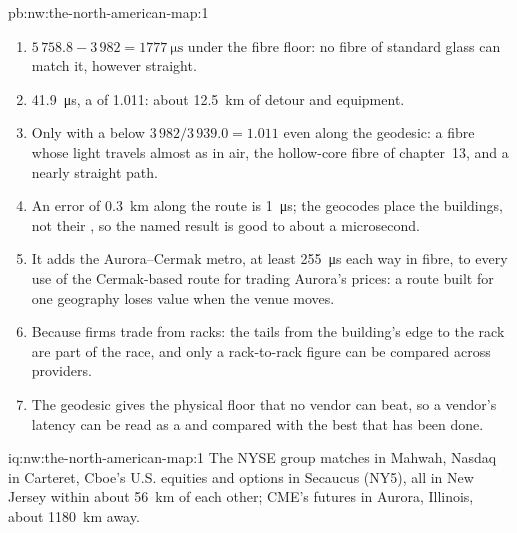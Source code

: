 \begin{solution}{pb:nw:the-north-american-map:1}
\begin{enumerate}[resume]
\qty{3.940}{\milli\second} in air and \qty{5.759}{\milli\second} in fibre along the geodesic; the 2010 fibre from Cermak ran at a  of
1.21 over its own floor.
\item $5\,758.8 - 3\,982 = \qty{1777}{\micro\second}$ under the fibre floor: no fibre of standard glass can match it, however straight.
\item \qty{41.9}{\micro\second}, a  of 1.011: about \qty{12.5}{\kilo\metre} of detour and equipment.
\item Only with a  below $3\,982/3\,939.0 = 1.011$ even along the geodesic: a fibre whose light travels almost as in air, the
hollow-core fibre of chapter~13, and a nearly straight path.
\item An error of \qty{0.3}{\kilo\metre} along the route is \qty{1}{\micro\second}; the geocodes place the buildings, not their ,
so the named result is good to about a microsecond.
\item It adds the Aurora--Cermak metro, at least \qty{255}{\micro\second} each way in fibre, to every use of the Cermak-based route for trading
Aurora's prices: a route built for one geography loses value when the venue moves.
\item Because firms trade from racks: the tails from the building's edge to the rack are part of the race, and only a rack-to-rack figure can
be compared across providers.
\item The geodesic gives the physical floor that no vendor can beat, so a vendor's latency can be read as a  and compared with the
best that has been done.
\end{enumerate}
\end{solution}

\begin{solution}{iq:nw:the-north-american-map:1}
The NYSE group matches in Mahwah, Nasdaq in Carteret, Cboe's U.S. equities and options in Secaucus (NY5), all in New Jersey within about
\qty{56}{\kilo\metre} of each other; CME's futures in Aurora, Illinois, about \qty{1180}{\kilo\metre} away.
\end{solution}

